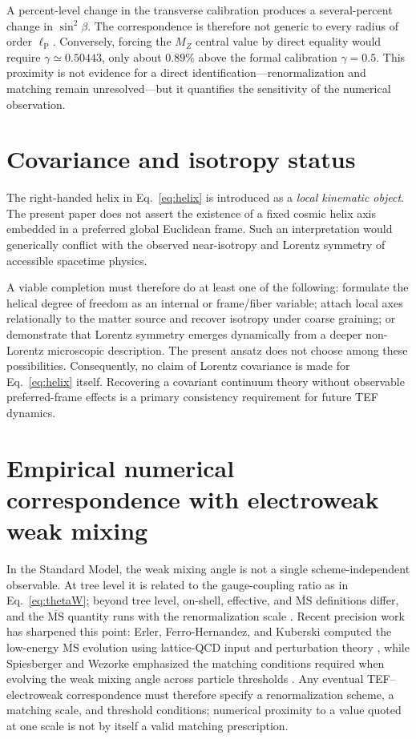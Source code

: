 \documentclass[aps,prd,reprint,nofootinbib,floatfix]{revtex4-2}
\begin{document}
A percent-level change in the transverse calibration produces a several-percent change in $\sin^2\beta$.  The correspondence is therefore not generic to every radius of order $\ell_{\mathrm P}$.  Conversely, forcing the $M_Z$ central value by direct equality would require $\gamma\simeq0.50443$, only about $0.89\%$ above the formal calibration $\gamma=0.5$.  This proximity is not evidence for a direct identification---renormalization and matching remain unresolved---but it quantifies the sensitivity of the numerical observation.

\section{Covariance and isotropy status}

The right-handed helix in Eq.~\eqref{eq:helix} is introduced as a \emph{local kinematic object}.  The present paper does not assert the existence of a fixed cosmic helix axis embedded in a preferred global Euclidean frame.  Such an interpretation would generically conflict with the observed near-isotropy and Lorentz symmetry of accessible spacetime physics.

A viable completion must therefore do at least one of the following: formulate the helical degree of freedom as an internal or frame/fiber variable; attach local axes relationally to the matter source and recover isotropy under coarse graining; or demonstrate that Lorentz symmetry emerges dynamically from a deeper non-Lorentz microscopic description.  The present ansatz does not choose among these possibilities.  Consequently, no claim of Lorentz covariance is made for Eq.~\eqref{eq:helix} itself.  Recovering a covariant continuum theory without observable preferred-frame effects is a primary consistency requirement for future TEF dynamics.

\section{Empirical numerical correspondence with electroweak weak mixing}

In the Standard Model, the weak mixing angle is not a single scheme-independent observable.  At tree level it is related to the gauge-coupling ratio as in Eq.~\eqref{eq:thetaW}; beyond tree level, on-shell, effective, and $\overline{\mathrm{MS}}$ definitions differ, and the $\overline{\mathrm{MS}}$ quantity runs with the renormalization scale \cite{PDG2026EW}.  Recent precision work has sharpened this point: Erler, Ferro-Hernandez, and Kuberski computed the low-energy $\overline{\mathrm{MS}}$ evolution using lattice-QCD input and perturbation theory \cite{ErlerFerroKuberski2024}, while Spiesberger and Wezorke emphasized the matching conditions required when evolving the weak mixing angle across particle thresholds \cite{SpiesbergerWezorke2024}.  Any eventual TEF--electroweak correspondence must therefore specify a renormalization scheme, a matching scale, and threshold conditions; numerical proximity to a value quoted at one scale is not by itself a valid matching prescription.
\end{document}
